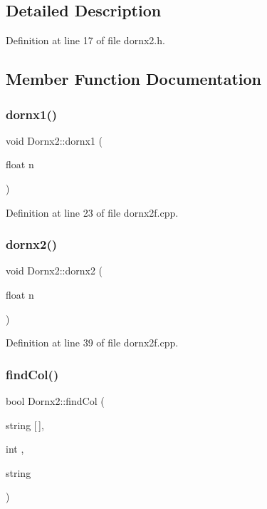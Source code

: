 \subsection{Detailed Description}


Definition at line 17 of file dornx2.\+h.



\subsection{Member Function Documentation}
\mbox{\label{class_dornx2_abec89827e72c13b981b5fbd169234463}} 
\subsubsection{\texorpdfstring{dornx1()}{dornx1()}}
{\footnotesize\ttfamily void Dornx2\+::dornx1 (\begin{DoxyParamCaption}\item[{float}]{n }\end{DoxyParamCaption})}



Definition at line 23 of file dornx2f.\+cpp.

\mbox{\label{class_dornx2_aa3fcfcbe016f42f136e105e58d58baf7}} 
\subsubsection{\texorpdfstring{dornx2()}{dornx2()}}
{\footnotesize\ttfamily void Dornx2\+::dornx2 (\begin{DoxyParamCaption}\item[{float}]{n }\end{DoxyParamCaption})}



Definition at line 39 of file dornx2f.\+cpp.

\mbox{\label{class_dornx2_adf347547aec5c4ff26a6a6650d992062}} 
\subsubsection{\texorpdfstring{find\+Col()}{findCol()}}
{\footnotesize\ttfamily bool Dornx2\+::find\+Col (\begin{DoxyParamCaption}\item[{string}]{\mbox{[}$\,$\mbox{]},  }\item[{int}]{,  }\item[{string}]{ }\end{DoxyParamCaption})}

